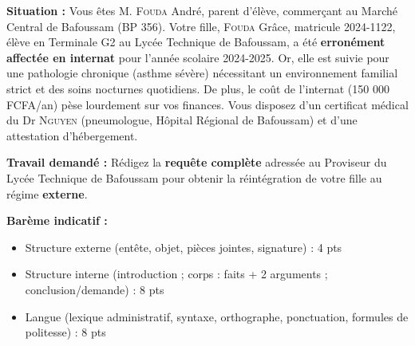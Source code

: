 \documentclass[11pt]{article}
\begin{document}
\begin{exercice}
\textbf{Situation :} Vous êtes M. \textsc{Fouda} André, parent d'élève, commerçant au Marché Central de Bafoussam (BP 356). Votre fille, \textsc{Fouda} Grâce, matricule 2024-1122, élève en Terminale G2 au Lycée Technique de Bafoussam, a été \textbf{erronément affectée en internat} pour l'année scolaire 2024-2025. Or, elle est suivie pour une pathologie chronique (asthme sévère) nécessitant un environnement familial strict et des soins nocturnes quotidiens. De plus, le coût de l'internat (150 000 FCFA/an) pèse lourdement sur vos finances. Vous disposez d'un certificat médical du Dr \textsc{Nguyen} (pneumologue, Hôpital Régional de Bafoussam) et d'une attestation d'hébergement.

\textbf{Travail demandé :} Rédigez la \textbf{requête complète} adressée au Proviseur du Lycée Technique de Bafoussam pour obtenir la réintégration de votre fille au régime \textbf{externe}.

\textbf{Barème indicatif :}
\begin{itemize}
    \item Structure externe (entête, objet, pièces jointes, signature) : 4 pts
    \item Structure interne (introduction ; corps : faits + 2 arguments ; conclusion/demande) : 8 pts
    \item Langue (lexique administratif, syntaxe, orthographe, ponctuation, formules de politesse) : 8 pts
\end{itemize}
\end{exercice}
\end{document}
